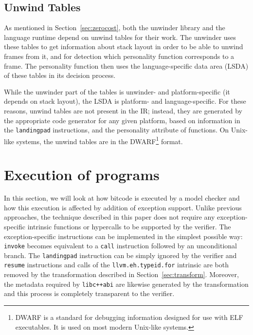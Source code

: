 \subsection{Unwind Tables}\label{unwind-tables}

As mentioned in Section~\ref{sec:zerocost}, both the unwinder library
and the language runtime depend on unwind tables for their work. The
unwinder uses these tables to get information about stack layout in
order to be able to unwind frames from it, and for detection which
personality function corresponds to a frame. The personality function
then uses the language-specific data area (LSDA) of these tables in its
decision process.

While the unwinder part of the tables is unwinder- and platform-specific
(it depends on stack layout), the LSDA is platform- and
language-specific. For these reasons, unwind tables are not present in
the \llvm{} IR; instead, they are generated by the appropriate code
generator for any given platform, based on information in the
\texttt{landingpad} instructions, and the personality attribute of
functions. On Unix-like systems, the unwind tables are in the
DWARF\footnote{DWARF is a standard for debugging information designed
  for use with ELF executables. It is used on most modern Unix-like
  systems.} format.

\section{Execution of \llvm{} programs}\label{sec:execution}

In this section, we will look at how \llvm{} bitcode is executed by a model
checker and how this execution is affected by addition of exception
support. Unlike previous approaches, the technique described in this
paper does not require any exception-specific intrinsic functions or
hypercalls to be supported by the verifier. The exception-specific \llvm{}
instructions can be implemented in the simplest possible way:
\texttt{invoke} becomes equivalent to a \texttt{call} instruction
followed by an unconditional branch. The \texttt{landingpad} instruction
can be simply ignored by the verifier and \texttt{resume} instructions
and calls of the \texttt{llvm.eh.typeid.for} intrinsic are both removed
by the transformation described in Section~\ref{sec:transform}.
Moreover, the metadata required by \texttt{libc++abi} are likewise
generated by the \llvm{} transformation and this process is completely
transparent to the verifier.

